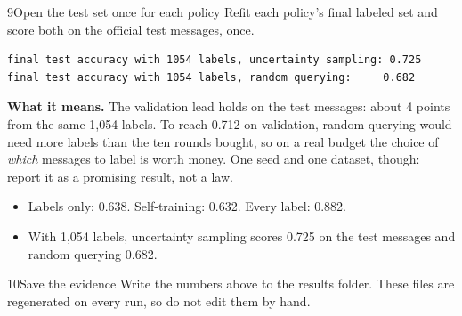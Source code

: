 \begin{labquestion}{9}{Open the test set once for each policy}
Refit each policy's final labeled set and score both on the official test messages, once.
\end{labquestion}
\begin{labanswer}

\begin{refoutput}
\begin{lstlisting}[style=utpterminal]
final test accuracy with 1054 labels, uncertainty sampling: 0.725
final test accuracy with 1054 labels, random querying:     0.682
\end{lstlisting}
\end{refoutput}

\textbf{What it means.} The validation lead holds on the test messages: about 4 points from the same 1,054 labels. To reach 0.712 on validation, random querying would need more labels than the ten rounds bought, so on a real budget the choice of \emph{which} messages to label is worth money. One seed and one dataset, though: report it as a promising result, not a law.
\end{labanswer}

\begin{labcheckpoint}
\begin{itemize}[leftmargin=1.2em,itemsep=2pt,topsep=1pt]
  \item Labels only: 0.638. Self-training: 0.632. Every label: 0.882.
  \item With 1,054 labels, uncertainty sampling scores 0.725 on the test messages and random querying 0.682.
\end{itemize}
\end{labcheckpoint}


\begin{labquestion}{10}{Save the evidence}
Write the numbers above to the results folder. These files are regenerated on every run, so do not edit them by hand.
\end{labquestion}
\begin{labanswer}

\end{labanswer}

